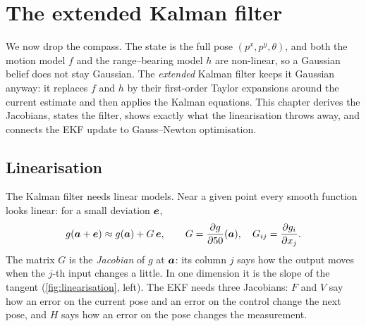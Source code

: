 \chapter{The extended Kalman filter}
\label{ch:ekf}

We now drop the compass. The state is the full pose $(p^x,p^y,\theta)$,
and both the motion model $f$ and the range--bearing model $h$ are
non-linear, so a Gaussian belief does not stay Gaussian. The \emph{extended}
Kalman filter keeps it Gaussian anyway: it replaces $f$ and $h$ by their
first-order Taylor expansions around the current estimate and then applies
the Kalman equations. This chapter derives the Jacobians, states the
filter, shows exactly what the linearisation throws away, and connects
the EKF update to Gauss--Newton optimisation.

\section{Linearisation}

The Kalman filter needs linear models. Near a given point every smooth
function looks linear: for a small deviation $\bm{e}$,
\[
  g(\bm{a}+\bm{e})\approx g(\bm{a})+G\,\bm{e},\qquad
  G=\frac{\partial g}{\partial50}(\bm{a}),\quad
  G_{ij}=\frac{\partial g_i}{\partial x_j}.
\]
The matrix $G$ is the \emph{Jacobian} of $g$ at $\bm{a}$: its column $j$
says how the output moves when the $j$-th input changes a little. In one
dimension it is the slope of the tangent (\cref{fig:linearisation}, left).
The EKF needs three Jacobians: $F$ and $V$ say how an error on the current
pose and an error on the control change the next pose, and $H$ says how an
error on the pose changes the measurement.

